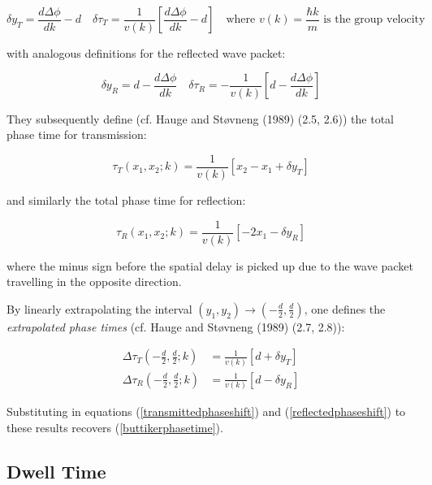 \documentclass{article}
\begin{document}
\begin{equation}
	\delta y_T = \frac{d\Delta\phi}{dk}-d \quad \delta\tau_T=\frac{1}{v(k)} \left[\frac{d\Delta\phi}{dk}-d\right] \quad \text{where $v(k) = \frac{\hbar k}{m}$ is the group velocity}
	\label{transmittedphaseshift}
\end{equation}

\noindent with analogous definitions for the reflected wave packet:

\begin{equation}
	\delta y_R = d-\frac{d\Delta\phi}{dk} \quad \delta\tau_R=-\frac{1}{v(k)} \left[d-\frac{d\Delta\phi}{dk}\right]
	\label{reflectedphaseshift}
\end{equation}

\noindent They subsequently define (cf. Hauge and St{\o}vneng (1989) (2.5, 2.6)) the total phase time for transmission:

\begin{equation}
	\tau_T(x_1,x_2;k) = \frac{1}{v(k)}[x_2-x_1+\delta y_T]
\end{equation}

\noindent and similarly the total phase time for reflection:

\begin{equation}
	\tau_R(x_1,x_2;k) = \frac{1}{v(k)}[-2x_1-\delta y_R]
\end{equation}

\noindent where the minus sign before the spatial delay is picked up due to the wave packet travelling in the opposite direction.

\noindent By linearly extrapolating the interval $(y_1,y_2) \rightarrow (-\frac{d}{2},\frac{d}{2})$, one defines the \textit{extrapolated phase times} (cf. Hauge and St{\o}vneng (1989) (2.7, 2.8)):

\begin{align}
	\Delta\tau_T(-\frac{d}{2},\frac{d}{2};k) &= \frac{1}{v(k)}[d+\delta y_T] \\
	\Delta\tau_R(-\frac{d}{2},\frac{d}{2};k) &= \frac{1}{v(k)}[d-\delta y_R]
\end{align}

\noindent Substituting in equations (\ref{transmittedphaseshift}) and (\ref{reflectedphaseshift}) to these results recovers (\ref{buttikerphasetime}).

\subsection{Dwell Time}
\label{subsection:dwelltime}
\end{document}
